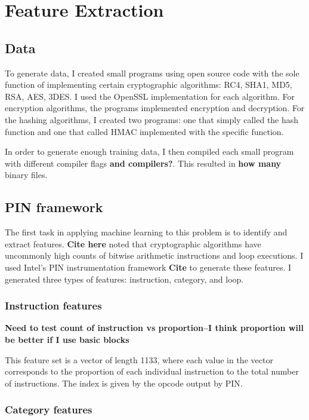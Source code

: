 \chapter{Feature Extraction}

\section{Data}
To generate data, I created small programs using open source code with the sole function of implementing certain cryptographic algorithms: RC4, SHA1, MD5, RSA, AES, 3DES.  I used the OpenSSL implementation for each algorithm.  For encryption algorithms, the programs implemented encryption and decryption.  For the hashing algorithms, I created two programs: one that simply called the hash function and one that called HMAC implemented with the specific function.

In order to generate enough training data, I then compiled each small program with different compiler flags \textbf{and compilers?}.  This resulted in \textbf{how many} binary files.


\section{PIN framework}
The first task in applying machine learning to this problem is to identify and extract features.  \textbf{Cite here} noted that cryptographic algorithms have uncommonly high counts of bitwise arithmetic instructions and loop executions.  I used Intel's PIN instrumentation framework \textbf{Cite} to generate these features.  I generated three types of features: instruction, category, and loop.

\subsection{Instruction features}
\textbf{Need to test count of instruction vs proportion--I think proportion will be better if I use basic blocks}

This feature set is a vector of length 1133, where each value in the vector corresponds to the proportion of each individual instruction to the total number of instructions.  The index is given by the opcode output by PIN.

\subsection{Category features}

